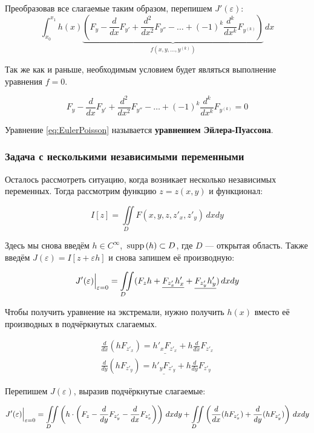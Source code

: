 \documentclass[12pt]{article}
\begin{document}
			Преобразовав все слагаемые таким образом, перепишем $J'(\varepsilon)$:
			$$\int_{x_0}^{x_1} h(x)
				\underbrace{\left(F_y - \frac{d}{dx}F_{y'} + \frac{d^2}{dx^2}F_{y''} - 
				\ldots + (-1)^k\frac{d^k}{dx^k}F_{y^{(k)}}\right)}_{f(x, y, \ldots, y^{(k)})} \,dx$$

			Так же как и раньше, необходимым условием будет являться выполнение уравнения $f = 0$.
	
			\begin{equation} \label{eq:EulerPoisson}
				F_y - \frac{d}{dx}F_{y'} + \frac{d^2}{dx^2}F_{y''} - 
				\ldots + (-1)^k\frac{d^k}{dx^k}F_{y^{(k)}} = 0
			\end{equation}
	
			Уравнение \ref{eq:EulerPoisson} называется \textbf{уравнением Эйлера-Пуассона}.

		\subsubsection{Задача с несколькими независимыми переменными}

			Осталось рассмотреть ситуацию, когда возникает несколько независимых переменных. Тогда рассмотрим
			функцию $z = z(x,y)$ и функционал:

			$$I[z] = \underset{D\hspace{10pt}}{\iint} F(x, y, z, z'_x, z'_y) \,dxdy$$
	
			Здесь мы снова введём $h \in C^{\infty}$, $\,\text{supp}\,(h) \subset D$, где $D$ --- открытая область.
			Также введём $J(\varepsilon) = I[z + \varepsilon h]$ и снова запишем её производную:

			$$J'(\varepsilon)\Big|_{\varepsilon = 0}^{} = 
	  		\underset{D\hspace{10pt}}{\iint} (F_zh + \underline{F_{z'_x}h'_x} + \underline{F_{z'_y}h'_y}) \,dxdy$$

			Чтобы получить уравнение на экстремали, нужно получить $h(x)$ вместо её производных в
			подчёркнутых слагаемых.
	
			\begin{align*}
				\frac{d}{dx}(h F_{z'_x}) = \underline{h'_xF_{z'_x}} + h\frac{d}{dx}F_{z'_x} \\
				\frac{d}{dy}(h F_{z'_y}) = \underline{h'_yF_{z'_y}} + h\frac{d}{dy}F_{z'_y}
			\end{align*}

			Перепишем $J(\varepsilon)$, выразив подчёркнутые слагаемые:
	
			$$
				J'(\varepsilon)\Big|_{\varepsilon = 0}^{} = 
				\underset{D\hspace{10pt}}{\iint} \left( h\cdot\left(F_z - \frac{d}{dy}F_{z'_y} - \frac{d}{dx}F_{z'_x}\right) \right) \,dxdy
				+ \underset{D\hspace{10pt}}{\iint} \left(\frac{d}{dx}(hF_{z'_x}) + \frac{d}{dy}(hF_{z'_y}) \right) \,dxdy
			$$
\end{document}
